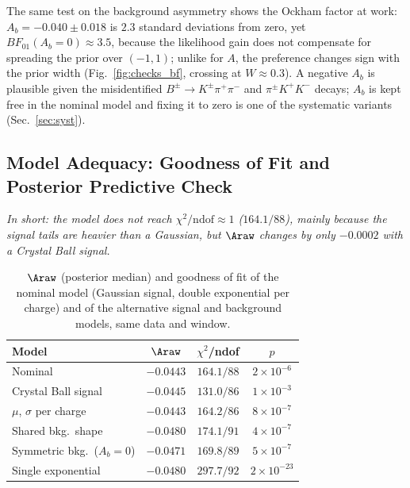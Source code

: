 The same test on the background asymmetry shows the Ockham factor at work: $A_b=-0.040\pm0.018$ is $2.3$ standard deviations from zero, yet $BF_{01}(A_b=0)\approx3.5$, because the likelihood gain does not compensate for spreading the prior over $(-1,1)$; unlike for $A$, the preference changes sign with the prior width (Fig.~\ref{fig:checks_bf}, crossing at $W\approx0.3$). A negative $A_b$ is plausible given the misidentified $B^\pm\to K^\pm\pi^+\pi^-$ and $\pi^\pm K^+K^-$ decays; $A_b$ is kept free in the nominal model and fixing it to zero is one of the systematic variants (Sec.~\ref{sec:syst}).



\subsection{Model Adequacy: Goodness of Fit and Posterior Predictive Check}
\label{sec:bayes_gof}
\emph{In short: the model does not reach $\chi^2/\mathrm{ndof}\approx1$ ($164.1/88$), mainly because the signal tails are heavier than a Gaussian, but $\Araw$ changes by only $-0.0002$ with a Crystal Ball signal.}
\begin{table}[!t]
\centering
\begin{tabular}{lccc}
\toprule
Model & $\Araw$ & $\chi^2$/ndof & $p$ \\
\midrule
Nominal & $-0.0443$ & $164.1/88$ & $2\times10^{-6}$ \\
Crystal Ball signal & $-0.0445$ & $131.0/86$ & $1\times10^{-3}$ \\
$\mu$, $\sigma$ per charge & $-0.0443$ & $164.2/86$ & $8\times10^{-7}$ \\
Shared bkg.\ shape & $-0.0480$ & $174.1/91$ & $4\times10^{-7}$ \\
Symmetric bkg.\ ($A_b=0$) & $-0.0471$ & $169.8/89$ & $5\times10^{-7}$ \\
Single exponential & $-0.0480$ & $297.7/92$ & $2\times10^{-23}$ \\
\bottomrule
\end{tabular}
\caption{$\Araw$ (posterior median) and goodness of fit of the nominal model (Gaussian signal, double exponential per charge) and of the alternative signal and background models, same data and window.}
\label{tab:gof}
\end{table}



